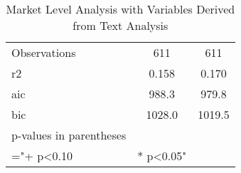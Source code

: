 \begin{table}[]
\begin{tabular}{@{}lcc@{}}
Observations                          & 611                 & 611           \\
r2                                    & 0.158               & 0.170         \\
aic                                   & 988.3               & 979.8         \\
bic                                   & 1028.0              & 1019.5        \\
p-values in parentheses               &                     &               \\
="+ p\textless{}0.10                  & * p\textless{}0.05" &               \\ \bottomrule
\end{tabular}
\caption{Market Level Analysis with Variables Derived from Text Analysis}
\label{reg_mkt_textbased_simplified}
\end{table}